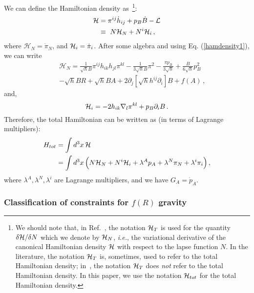 \documentclass[a4paper,12pt]{article}
\newcommand{\da}{\delta}
\newcommand{\la}{\lambda}
\newcommand{\cH}{{\cal H}}
\newcommand{\+}{^{\dagger}}
\newcommand{\2}{\frac{1}{2}}
\newcommand{\3}{\frac{1}{3}}
\newcommand{\4}{\frac{1}{4}}
\newcommand{\6}{\frac{1}{6}}
\newcommand{\8}{\frac{1}{8}}
\begin{document}
We can define the Hamiltonian density as~\footnote{We should note that, in Ref.~\cite{Kluson:2011tb}, the notation $\cH_T$ is used for the quantity $\da \cH / \da N$ which we denote by $\cH_N$, \textit{i.e.}, the variational derivative of the canonical Hamiltonian density $\cH$ with respect to the lapse function $N$. In the literature, the notation $\cH_T$ is, sometimes, used to refer to the total Hamiltonian density; in~\cite{Kluson:2011tb}, the notation $\cH_T$ does \textit{not} refer to the total Hamiltonian density. In this paper, we use the notation $\cH_{tot}$ for the total Hamiltonian density.}: 
\begin{align}\label{hamdensity1}
\mathcal{H}&=\pi^{ij}\dot{h}_{ij}+p_B\dot{B}-\mathcal{L}\\
&\equiv\ N\mathcal{H}_N+N^i\cH_i \,,
\end{align}
where  $\mathcal{H}_N=\dot\pi_N$, and $\cH_i=\dot{\pi}_{i}$.
After some algebra  and using Eq. (\ref{hamdensity1}), we can write 
\begin{eqnarray}\label{h1}
&&\mathcal{H}_N=\frac{1}{\sqrt{h}B}\pi^{ij}h_{ik}h_{jl}\pi^{kl}-\frac{1}{3\sqrt{h}B}\pi^2-\frac{\pi
p_B}{3\sqrt{h}}+\frac{B}{6\sqrt{h}}p_B^{2}\nonumber\\&&-\sqrt{h}BR+\sqrt{h}BA+2\partial_j[\sqrt{h}h^{ij}\partial_i]B+f(A)\,,
\end{eqnarray}
 and, 
\begin{equation}\label{h2}
\cH_i=-2h_{ik}\nabla_l\pi^{kl}+p_B\partial_iB\,.
\end{equation}
%
Therefore, the total Hamiltonian can be written as  (in terms of Lagrange multipliers):
\begin{align}
H_{tot}&=\int d^3 x \, \cH \\
&=\int d^{3}x \, \Big(N\mathcal{H}_N+N^i\cH_i+\lambda^{A}p_A+\lambda^{N}\pi_N+\lambda^{i}\pi_i\Big)\,,
\end{align}
where  $\lambda^{A},\lambda^{N},\la^{i}$ are Lagrange multipliers, and we have  $G_A=\dot p_A$.   



\subsubsection{Classification of constraints for $f(R)$ gravity}
\end{document}
